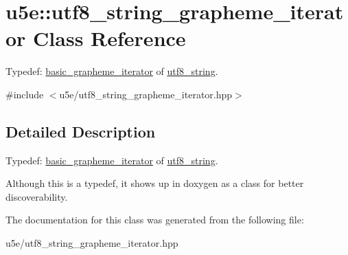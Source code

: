 \hypertarget{classu5e_1_1utf8__string__grapheme__iterator}{}\section{u5e\+:\+:utf8\+\_\+string\+\_\+grapheme\+\_\+iterator Class Reference}
\label{classu5e_1_1utf8__string__grapheme__iterator}


Typedef\+: \hyperlink{classu5e_1_1basic__grapheme__iterator}{basic\+\_\+grapheme\+\_\+iterator} of \hyperlink{classu5e_1_1utf8__string}{utf8\+\_\+string}.  




{\ttfamily \#include $<$u5e/utf8\+\_\+string\+\_\+grapheme\+\_\+iterator.\+hpp$>$}



\subsection{Detailed Description}
Typedef\+: \hyperlink{classu5e_1_1basic__grapheme__iterator}{basic\+\_\+grapheme\+\_\+iterator} of \hyperlink{classu5e_1_1utf8__string}{utf8\+\_\+string}. 

Although this is a typedef, it shows up in doxygen as a class for better discoverability. 

The documentation for this class was generated from the following file\+:\begin{DoxyCompactItemize}
\item 
u5e/utf8\+\_\+string\+\_\+grapheme\+\_\+iterator.\+hpp\end{DoxyCompactItemize}
